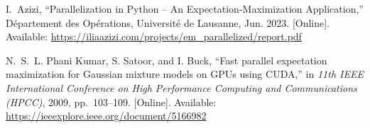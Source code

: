 \documentclass[conference]{IEEEtran}
\begin{document}

\begin{thebibliography}{1}

I.~Azizi, ``Parallelization in Python -- An Expectation-Maximization Application,'' Département des Opérations, Université de Lausanne, Jun. 2023. [Online]. Available: \url{https://iliaazizi.com/projects/em_parallelized/report.pdf}

N.~S.~L. Phani Kumar, S. Satoor, and I. Buck, ``Fast parallel expectation maximization for Gaussian mixture models on GPUs using CUDA,'' in \emph{11th IEEE International Conference on High Performance Computing and Communications (HPCC)}, 2009, pp.~103--109. [Online]. Available: \url{https://ieeexplore.ieee.org/document/5166982}

\end{thebibliography}
\end{document}
